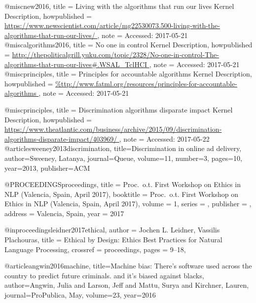 
@misc{new2016,
  title = {{Living with the algorithms that run our lives} Kernel Description},
  howpublished = {\url{https://www.newscientist.com/article/mg22530073.500-living-with-the-algorithms-that-run-our-lives/
}},
  note = {Accessed: 2017-05-21}
}
@misc{algorithms2016,
  title = {{No one in control} Kernel Description},
  howpublished = {\url{http://thepoliticalgrill.yuku.com/topic/2328/No-one-in-control-The-algorithms-that-run-our-lives#.WSAL_TclHCI
}},
  note = {Accessed: 2017-05-21}
}
@misc{principles,
  title = {{Principles for accountable algorithms} Kernel Description},
  howpublished = {\url{%
}},
  note = {Accessed: 2017-05-21}
}

@misc{principles,
  title = {{Discrimination algorithms disparate impact} Kernel Description},
  howpublished = {\url{https://www.theatlantic.com/business/archive/2015/09/discrimination-algorithms-disparate-impact/403969/
}},
  note = {Accessed: 2017-05-22}
}
@article{sweeney2013discrimination,
  title={Discrimination in online ad delivery},
  author={Sweeney, Latanya},
  journal={Queue},
  volume={11},
  number={3},
  pages={10},
  year={2013},
  publisher={ACM}
}

@PROCEEDINGS{proceedings,
  title = {Proc.\ o.t. First Workshop on Ethics in NLP
      (Valencia, Spain, April 2017)},
  booktitle = {Proc.\ o.t. First Workshop on Ethics in NLP
      (Valencia, Spain, April 2017)},
  volume = 1,
  series = {},
  publisher = {},
  address = {Valencia, Spain},
  year = {2017}
}

@inproceedings{leidner2017ethical,
  author =       {Jochen L. Leidner, Vassilis Plachouras},
  title =        {Ethical by Design: Ethics Best Practices for Natural Language Processing},
  crossref =     {proceedings},
  pages =        {9--18},
}

@article{angwin2016machine,
  title={Machine bias: There’s software used across the country to predict future criminals. and it’s biased against blacks},
  author={Angwin, Julia and Larson, Jeff and Mattu, Surya and Kirchner, Lauren},
  journal={ProPublica, May},
  volume={23},
  year={2016}
}




